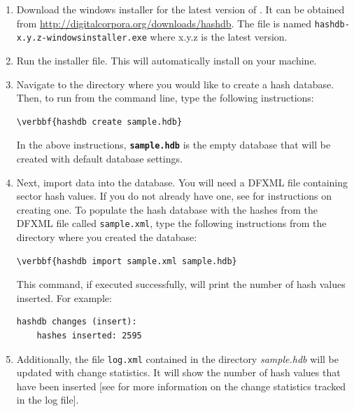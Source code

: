 \documentclass[11pt,fleqn]{article} %
\begin{document}
\begin{enumerate}
\item Download the windows installer for the latest version of \hash. It can be obtained from \url{http://digitalcorpora.org/downloads/hashdb}. The file is named \texttt{hashdb-x.y.z-windowsinstaller.exe} where x.y.z is the latest version. 

\item Run the installer file. This will automatically install \hash on your machine.

\item Navigate to the directory where you would like to create a hash database. Then, to run \hash from the command line, type the following instructions: 
\begin{Verbatim}[commandchars=\\\{\}]
\verbbf{hashdb create sample.hdb}
\end{Verbatim} 

In the above instructions, \texttt{\textbf{sample.hdb}} is the empty database that will be created with default database settings.

\item Next, import data into the database. You will need a DFXML file containing sector hash values. If you do not already have one, see \textbf{} for instructions on creating one. To populate the hash database with the hashes from the DFXML file called \texttt{sample.xml}, type the following instructions from the directory where you created the database:
\begin{Verbatim}[commandchars=\\\{\}]
\verbbf{hashdb import sample.xml sample.hdb}
\end{Verbatim} 
This command, if executed successfully, will print the number of hash values inserted. For example: 
\begingroup
\footnotesize
\begin{Verbatim}[fontfamily=courier]
hashdb changes (insert):
    hashes inserted: 2595
\end{Verbatim}
\endgroup
\item Additionally, the file \texttt{log.xml} contained in the directory \textit{sample.hdb} will be updated with change statistics. It will show the number of hash values that have been inserted [see \textbf{} for more information on the change statistics tracked in the log file].
 

\end{enumerate}
\end{document}
